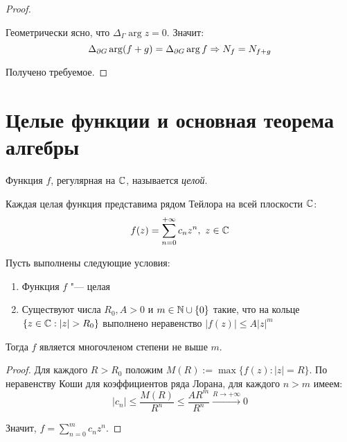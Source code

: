 \begin{proof}
\begin{center}
	\end{center}
	
	Геометрически ясно, что $\Delta_\Gamma\arg{z} = 0$. Значит:
	\[\Delta_{\partial G}\arg (f+g) = \Delta_{\partial G}\arg f \Rightarrow N_f = N_{f+g}\]
	
	Получено требуемое.
\end{proof}

\section{Целые функции и основная теорема алгебры}

\begin{definition}
	Функция $f$, регулярная на $\mathbb{C}$, называется \textit{целой}.
\end{definition}

\begin{note}
	Каждая целая функция представима рядом Тейлора на всей плоскости $\mathbb{C}$:
	\[f(z) = \sum_{n=0}^{+\infty}c_nz^n,~z \in \mathbb{C}\]
\end{note}

\begin{proposition}
	Пусть выполнены следующие условия:
	\begin{enumerate}
		\item Функция $f$ "--- целая
		\item Существуют числа $R_0, A > 0$ и $m \in \mathbb{N} \cup \{0\}$ такие, что на кольце $\{z \in \mathbb{C}: |z| > R_0\}$ выполнено неравенство $|f(z)| \le A|z|^m$
	\end{enumerate}
	
	Тогда $f$ является многочленом степени не выше $m$.
\end{proposition}

\begin{proof}
	Для каждого $R > R_0$ положим $M(R) := \max\{f(z): |z| = R\}$. По неравенству Коши для коэффициентов ряда Лорана, для каждого $n >m $ имеем:
	\[|c_n| \le \frac{M(R)}{R^n} \le \frac{AR^m}{R^n} \xrightarrow{R \to +\infty} 0\]
	
	Значит, $f = \sum_{n = 0}^mc_nz^n$.
\end{proof}

